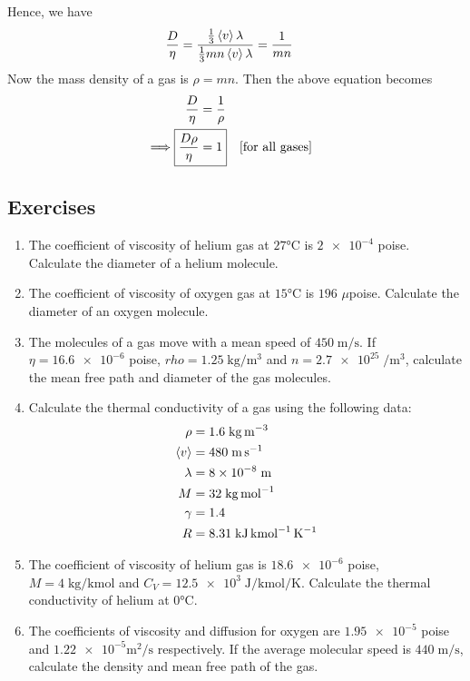 		Hence, we have
		\begin{align*}
			\dfrac{D}{\eta}&=\dfrac{\frac{1}{3}\expval{v}\lambda}{\frac{1}{3}mn\expval{v}\lambda}=\dfrac{1}{mn}
		\end{align*}
		Now the mass density of a gas is $\rho=mn$. Then the above equation becomes
		\begin{align*}
			\dfrac{D}{\eta}&=\dfrac{1}{\rho} \\
			\implies\Aboxed{\dfrac{D\rho}{\eta}&=1} \qq{[for all gases]}
		\end{align*}
	
	\subsection*{Exercises}
		\begin{enumerate}
			\item The coefficient of viscosity of helium gas at $27\unit{\celsius}$ is $\num{2e-4}$ poise. Calculate the diameter of a helium molecule.
			
			\item The coefficient of viscosity of oxygen gas at $15\unit{\celsius}$ is $196$ $\mu$poise. Calculate the diameter of an oxygen molecule.
			
			\item The molecules of a gas move with a mean speed of $450\;\unit{\metre\per\second}$. If $\eta=\num{16.6e-6}$ poise, $rho=1.25\;\unit{\kilo\gram\per\metre\cubed}$ and $n=\num{2.7e25}\;\unit{\per\metre\cubed}$, calculate the mean free path and diameter of the gas molecules.
			
			\item Calculate the thermal conductivity of a gas using the following data:
			\begin{align*}
				\rho&=1.6\;\unit{\kilo\gram\per\metre\cubed} \\
				\expval{v}&=480\;\unit{\metre\per\second} \\
				\lambda&=\num{8e-8}\;\unit{\metre} \\
				M&=32\;\unit{\kilo\gram\per\mole} \\
				\gamma&=1.4 \\
				R&=8.31\;\unit{\kilo\joule\per\kilo\mole\per\kelvin}
			\end{align*}
			
			\item The coefficient of viscosity of helium gas is $\num{18.6e-6}$ poise, $M=4\;\unit{\kilo\gram\per\kilo\mole}$ and $C_V=\num{12.5e3}\;\unit{\joule\per\kilo\mole\per\kelvin}$. Calculate the thermal conductivity of helium at $0\unit{\celsius}$.
			
			\item The coefficients of viscosity and diffusion for oxygen are $\num{1.95e-5}$ poise and $\num{1.22e-5}\unit{\metre\squared\per\second}$ respectively. If the average molecular speed is $440\;\unit{\metre\per\second}$, calculate the density and mean free path of the gas.
		\end{enumerate}